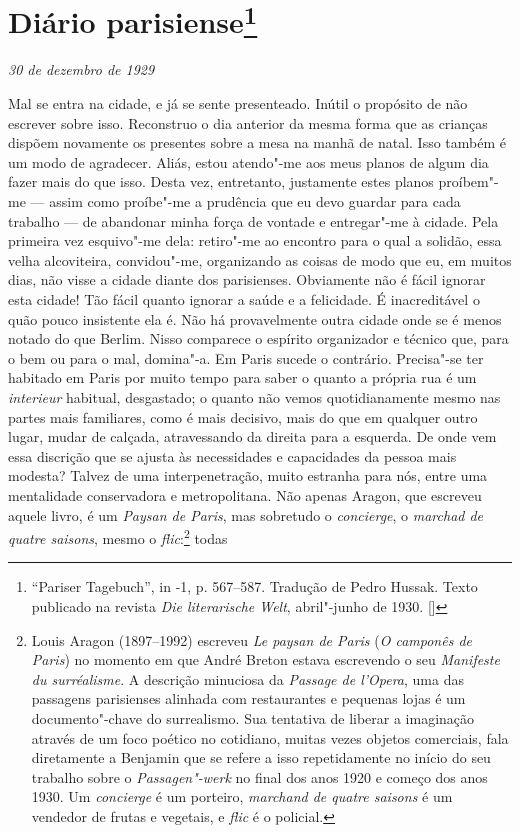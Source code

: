 \chapter{Diário parisiense\footnote[*]{``Pariser Tagebuch'', in -1, p.
  567--587. Tradução de Pedro Hussak. Texto publicado na revista \emph{Die literarische Welt}, abril"-junho de 1930. []}}

\begin{flushright}
\emph{30 de dezembro de 1929}
\end{flushright}

\noindent{}Mal se entra na cidade, e já se sente
presenteado. Inútil o propósito de não escrever sobre isso.
Reconstruo o dia anterior da mesma forma que as crianças dispõem
novamente os presentes sobre a mesa na manhã de natal. Isso também é um
modo de agradecer. Aliás, estou atendo"-me aos meus planos de algum dia
fazer mais do que isso. Desta vez, entretanto, justamente estes planos
proíbem"-me --- assim como proíbe"-me a prudência que eu devo guardar para
cada trabalho --- de abandonar minha força de vontade e entregar"-me à
cidade. Pela primeira vez esquivo"-me dela: retiro"-me ao encontro para o
qual a solidão, essa velha alcoviteira, convidou"-me, organizando as
coisas de modo que eu, em muitos dias, não visse a cidade diante dos
parisienses. Obviamente não é fácil ignorar esta cidade! Tão fácil quanto
ignorar a saúde e a felicidade. É inacreditável o quão pouco insistente
ela é. Não há provavelmente outra cidade onde se é menos notado
do que Berlim. Nisso comparece o espírito organizador e
técnico que, para o bem ou para o mal, domina"-a. Em Paris sucede o
contrário. Precisa"-se ter habitado em Paris por muito tempo para saber o
quanto a própria rua é um \emph{interieur} habitual, desgastado;
o quanto não vemos quotidianamente mesmo nas partes mais
familiares, como é mais decisivo, mais do que em qualquer outro lugar, mudar de
calçada, atravessando da direita para a esquerda. De onde vem essa discrição
que se ajusta às necessidades e capacidades da pessoa mais modesta?
Talvez de uma interpenetração, muito estranha para nós, entre uma
mentalidade conservadora e metropolitana. Não apenas Aragon, que
escreveu aquele livro, é um \emph{Paysan de Paris}, mas sobretudo o
\emph{concierge}, o \emph{marchad de quatre saisons}, mesmo o
\emph{flic}:\footnote{Louis Aragon (1897--1992) escreveu
  \emph{Le paysan de Paris} (\emph{O camponês de Paris}) no momento em que André Breton estava
  escrevendo o seu \emph{Manifeste du surréalisme}. A descrição
  minuciosa da \emph{Passage de l'Opera}, uma das passagens parisienses
  alinhada com restaurantes e pequenas lojas é um documento"-chave do
  surrealismo. Sua tentativa de liberar a imaginação através de um foco
  poético no cotidiano, muitas vezes objetos comerciais, fala diretamente
  a Benjamin que se refere a isso repetidamente no início do
  seu trabalho sobre o \emph{Passagen"-werk} no final dos anos 1920 e
  começo dos anos 1930. Um \emph{concierge} é um porteiro, \emph{marchand de quatre saisons} é um
  vendedor de frutas e vegetais, e \emph{flic} é o policial. \versal{[N.~O.]}} todas
